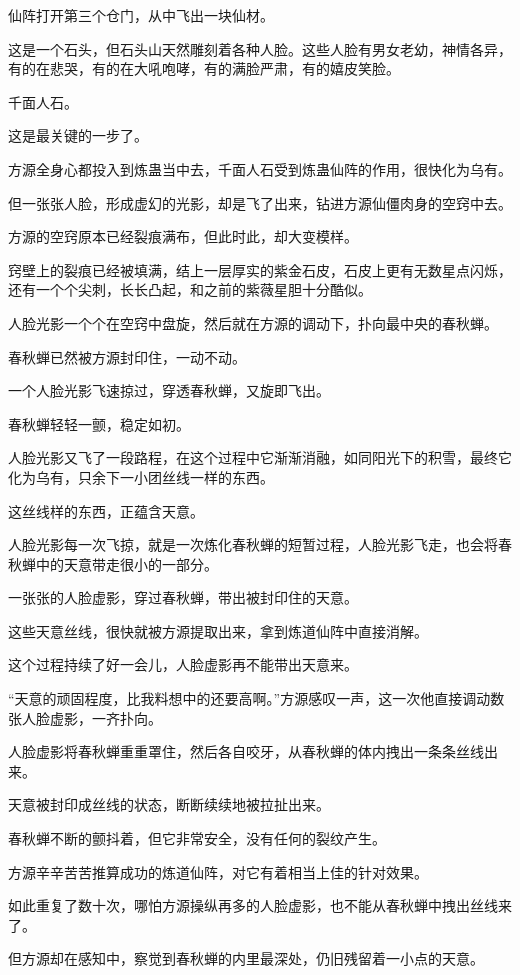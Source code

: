 \begin{this_body}
仙阵打开第三个仓门，从中飞出一块仙材。

这是一个石头，但石头山天然雕刻着各种人脸。这些人脸有男女老幼，神情各异，有的在悲哭，有的在大吼咆哮，有的满脸严肃，有的嬉皮笑脸。

千面人石。

这是最关键的一步了。

方源全身心都投入到炼蛊当中去，千面人石受到炼蛊仙阵的作用，很快化为乌有。

但一张张人脸，形成虚幻的光影，却是飞了出来，钻进方源仙僵肉身的空窍中去。

方源的空窍原本已经裂痕满布，但此时此，却大变模样。

窍壁上的裂痕已经被填满，结上一层厚实的紫金石皮，石皮上更有无数星点闪烁，还有一个个尖刺，长长凸起，和之前的紫薇星胆十分酷似。

人脸光影一个个在空窍中盘旋，然后就在方源的调动下，扑向最中央的春秋蝉。

春秋蝉已然被方源封印住，一动不动。

一个人脸光影飞速掠过，穿透春秋蝉，又旋即飞出。

春秋蝉轻轻一颤，稳定如初。

人脸光影又飞了一段路程，在这个过程中它渐渐消融，如同阳光下的积雪，最终它化为乌有，只余下一小团丝线一样的东西。

这丝线样的东西，正蕴含天意。

人脸光影每一次飞掠，就是一次炼化春秋蝉的短暂过程，人脸光影飞走，也会将春秋蝉中的天意带走很小的一部分。

一张张的人脸虚影，穿过春秋蝉，带出被封印住的天意。

这些天意丝线，很快就被方源提取出来，拿到炼道仙阵中直接消解。

这个过程持续了好一会儿，人脸虚影再不能带出天意来。

“天意的顽固程度，比我料想中的还要高啊。”方源感叹一声，这一次他直接调动数张人脸虚影，一齐扑向。

人脸虚影将春秋蝉重重罩住，然后各自咬牙，从春秋蝉的体内拽出一条条丝线出来。

天意被封印成丝线的状态，断断续续地被拉扯出来。

春秋蝉不断的颤抖着，但它非常安全，没有任何的裂纹产生。

方源辛辛苦苦推算成功的炼道仙阵，对它有着相当上佳的针对效果。

如此重复了数十次，哪怕方源操纵再多的人脸虚影，也不能从春秋蝉中拽出丝线来了。

但方源却在感知中，察觉到春秋蝉的内里最深处，仍旧残留着一小点的天意。


\end{this_body}
